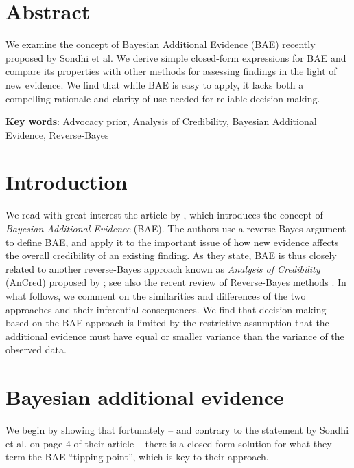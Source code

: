 \section*{Abstract}
We examine the concept of Bayesian Additional Evidence (BAE) recently proposed
by Sondhi et al. We derive simple closed-form expressions for BAE and compare
its properties with other methods for assessing findings in the light of new
evidence. We find that while BAE is easy to apply, it lacks both a compelling
rationale and clarity of use needed for reliable decision-making.

\textbf{Key words}: Advocacy prior, Analysis of Credibility, Bayesian Additional
Evidence, Reverse-Bayes


\section{Introduction}

We read with great interest the article by \citet{Sondhi2021}, which introduces
the concept of \emph{Bayesian Additional Evidence} (BAE). The authors use a
reverse-Bayes argument to define BAE, and apply it to the important issue of how
new evidence affects the overall credibility of an existing finding. As they
state, BAE is thus closely related to another reverse-Bayes approach known as
\emph{Analysis of Credibility} (AnCred) proposed by \citet{Matthews2018}; see
also the recent review of Reverse-Bayes methods \citep{Held2021b}. In what
follows, we comment on the similarities and differences of the two approaches
and their inferential consequences. We find that decision making based on the
BAE approach is limited by the restrictive assumption that the additional
evidence must have equal or smaller variance than the variance of the observed
data.


\section{Bayesian additional evidence}
We begin by showing that fortunately -- and contrary to the statement by Sondhi
et al. on page 4 of their article -- there is a closed-form solution for what
they term the BAE ``tipping point'', which is key to their approach.

